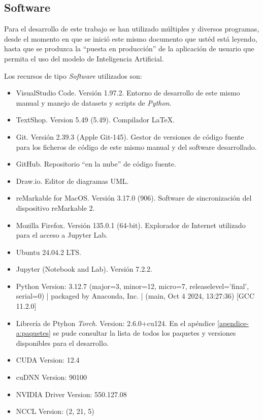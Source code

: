 %


\subsection{Software}

Para el desarrollo de este trabajo se han utilizado múltiples y diversos programas, desde el momento en que se inició este mismo documento que ustéd está leyendo, hasta que se produzca la ``puesta en producción'' de la aplicación de usuario que permita el uso del modelo de Inteligencia Artificial.

Los recursos de tipo \emph{Software} utilizados son:

\begin{itemize}
    \item VisualStudio Code. Versión 1.97.2. Entorno de desarrollo de este mismo manual y manejo de datasets y scripts de \emph{Python}.
    \item TextShop. Version 5.49 (5.49). Compilador \LaTeX.
    \item Git. Versión 2.39.3 (Apple Git-145). Gestor de versiones de código fuente para los ficheros de código de este mismo manual y del software desarrollado.
    \item GitHub. Repositorio ``en la nube'' de código fuente.
    \item Draw.io. Editor de diagramas UML.
    \item reMarkable for MacOS. Versión 3.17.0 (906). Software de sincronización del dispositivo reMarkable 2.
    \item Mozilla Firefox. Versión 135.0.1 (64-bit). Explorador de Internet utilizado para el acceso a Jupyter Lab.
    \item Ubuntu 24.04.2 LTS.
    \item Jupyter (Notebook and Lab). Versión 7.2.2.
    \item Python Version: 3.12.7 (major=3, minor=12, micro=7, releaselevel='final', serial=0) | packaged by Anaconda, Inc. | (main, Oct  4 2024, 13:27:36) [GCC 11.2.0]
    \item Librería de Ptyhon \emph{Torch}. Version: 2.6.0+cu124. En el apéndice \ref{apendice-a:paquetes} se pude consultar la lista de todos los paquetes y versiones disponibles para el desarrollo.
    \item CUDA Version: 12.4
    \item cuDNN Version: 90100
    \item NVIDIA Driver Version: 550.127.08
    \item NCCL Version: (2, 21, 5)
\end{itemize}

